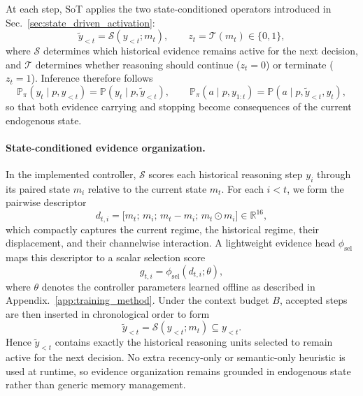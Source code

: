 At each step, SoT applies the two state-conditioned operators introduced in Sec.~\ref{sec:state_driven_activation}:
\begin{equation}
\widetilde{y}_{<t}=\mathcal{S}(y_{<t};m_t),
\qquad
z_t=\mathcal{T}(m_t)\in\{0,1\},
\end{equation}
where \(\mathcal{S}\) determines which historical evidence remains active for the next decision, and \(\mathcal{T}\) determines whether reasoning should continue (\(z_t=0\)) or terminate (\(z_t=1\)). 
Inference therefore follows
\begin{equation}
\mathbb{P}_{\pi}(y_t \mid p,y_{<t}) = \mathbb{P}\!\left(y_t \mid p,\widetilde{y}_{<t}\right),
\qquad
\mathbb{P}_{\pi}(a \mid p,y_{1:t}) = \mathbb{P}(a \mid p,\widetilde{y}_{<t}, y_t),
\end{equation}
so that both evidence carrying and stopping become consequences of the current endogenous state.

\paragraph{State-conditioned evidence organization.}
In the implemented controller, \(\mathcal{S}\) scores each historical reasoning step \(y_i\) through its paired state \(m_i\) relative to the current state \(m_t\). 
For each \(i<t\), we form the pairwise descriptor
\begin{equation}
d_{t,i}
=
\bigl[m_t;\,m_i;\,m_t-m_i;\,m_t\odot m_i\bigr]
\in \mathbb{R}^{16},
\label{eq:app_descriptor}
\end{equation}
which compactly captures the current regime, the historical regime, their displacement, and their channelwise interaction. 
A lightweight evidence head \(\phi_{\mathrm{sel}}\) maps this descriptor to a scalar selection score
\begin{equation}
g_{t,i}=\phi_{\mathrm{sel}}(d_{t,i};\theta),
\label{eq:app_sel_head}
\end{equation}
where \(\theta\) denotes the controller parameters learned offline as described in Appendix.~\ref{app:training_method}. 
Under the context budget \(B\), accepted steps are then inserted in chronological order to form
\begin{equation}
\widetilde{y}_{<t}
=
\mathcal{S}(y_{<t};m_t)
\subseteq y_{<t}.
\label{eq:app_bank_select}
\end{equation}
Hence \(\widetilde{y}_{<t}\) contains exactly the historical reasoning units selected to remain active for the next decision. 
No extra recency-only or semantic-only heuristic is used at runtime, so evidence organization remains grounded in endogenous state rather than generic memory management.


